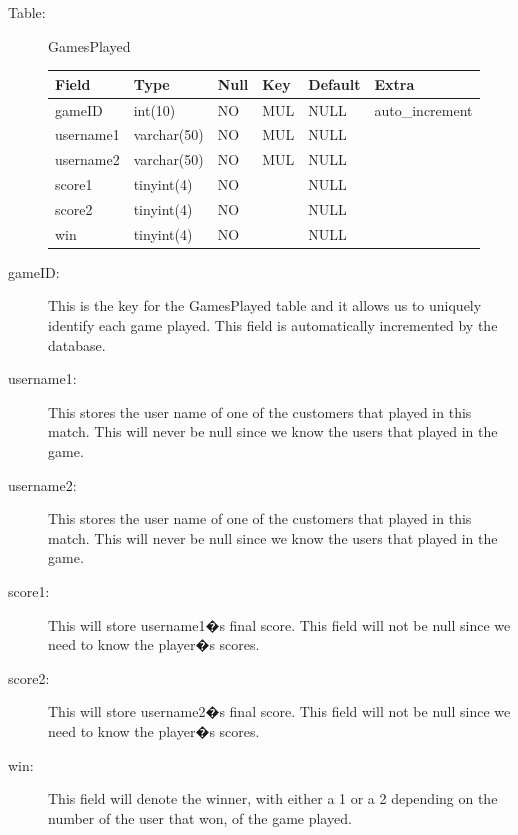 \begin{description}

\item[Table:] GamesPlayed

\begin{center}
    \begin{tabular}{ | l | l | l | l | l | l|}
    \hline
    Field & Type & Null & Key & Default & Extra \\ \hline \hline
    gameID & int(10) & NO & MUL & NULL & auto\_increment \\ \hline
    username1 & varchar(50) & NO & MUL & NULL &\hspace{1 pc}  \\ \hline
    username2 & varchar(50) & NO & MUL& NULL &\hspace{1 pc}  \\ \hline
    score1 & tinyint(4) & NO &\hspace{1 pc} & NULL &\hspace{1 pc}  \\ \hline
    score2 & tinyint(4) & NO &\hspace{1 pc} & NULL &\hspace{1 pc}   \\\hline
    win & tinyint(4) & NO &\hspace{1 pc} & NULL & \hspace{1 pc} \\
    \hline
    \end{tabular}
\end{center}
\item[gameID:] This is the key for the GamesPlayed table and it allows us to uniquely identify each game played. This field is automatically incremented by the database.
\item[username1:] This stores the user name of one of the customers that played in this match. This will never be null since we know the users that played in the game.
\item[username2:] This stores the user name of one of the customers that played in this match. This will never be null since we know the users that played in the game.
\item[score1:] This will store username1�s final score. This field will not be null since we need to know the player�s scores.
\item[score2:] This will store username2�s final score. This field will not be null since we need to know the player�s scores.
\item[win:] This field will denote the winner, with either a 1 or a 2 depending on the number of the user that won, of the game played.

\end{description}

